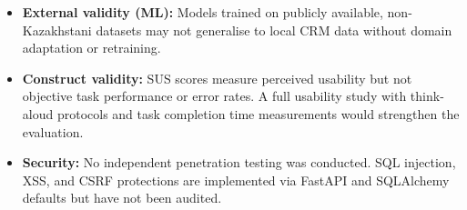 \begin{itemize}
  \item \textbf{External validity (ML):} Models trained on publicly
  available, non-Kazakhstani datasets may not generalise to local CRM
  data without domain adaptation or retraining.

  \item \textbf{Construct validity:} SUS scores measure perceived
  usability but not objective task performance or error rates. A full
  usability study with think-aloud protocols and task completion time
  measurements would strengthen the evaluation.

  \item \textbf{Security:} No independent penetration testing was
  conducted. SQL injection, XSS, and CSRF protections are implemented via
  FastAPI and SQLAlchemy defaults but have not been audited.

\end{itemize}
